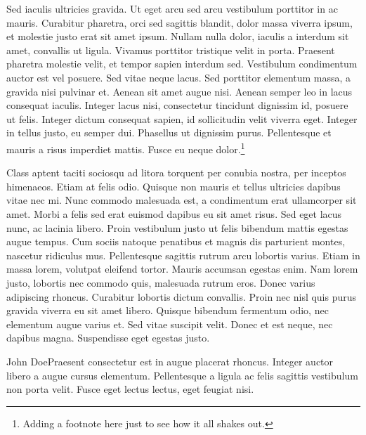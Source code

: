 Sed iaculis ultricies gravida. Ut eget arcu sed arcu vestibulum porttitor in ac mauris. Curabitur pharetra, orci sed sagittis blandit, dolor massa viverra ipsum, et molestie justo erat sit amet ipsum. Nullam nulla dolor, iaculis a interdum sit amet, convallis ut ligula. Vivamus porttitor tristique velit in porta. Praesent pharetra molestie velit, et tempor sapien interdum sed. Vestibulum condimentum auctor est vel posuere. Sed vitae neque lacus. Sed porttitor elementum massa, a gravida nisi pulvinar et. Aenean sit amet augue nisi. Aenean semper leo in lacus consequat iaculis. Integer lacus nisi, consectetur tincidunt dignissim id, posuere ut felis. Integer dictum consequat sapien, id sollicitudin velit viverra eget. Integer in tellus justo, eu semper dui. Phasellus ut dignissim purus. Pellentesque et mauris a risus imperdiet mattis. Fusce eu neque dolor.\footnote{Adding a footnote here just to see how it all shakes out. }

Class aptent taciti sociosqu ad litora torquent per conubia nostra, per inceptos himenaeos. Etiam at felis odio. Quisque non mauris et tellus ultricies dapibus vitae nec mi. Nunc commodo malesuada est, a condimentum erat ullamcorper sit amet. Morbi a felis sed erat euismod dapibus eu sit amet risus. Sed eget lacus nunc, ac lacinia libero. Proin vestibulum justo ut felis bibendum mattis egestas augue tempus. Cum sociis natoque penatibus et magnis dis parturient montes, nascetur ridiculus mus. Pellentesque sagittis rutrum arcu lobortis varius. Etiam in massa lorem, volutpat eleifend tortor. Mauris accumsan egestas enim. Nam lorem justo, lobortis nec commodo quis, malesuada rutrum eros. Donec varius adipiscing rhoncus. Curabitur lobortis dictum convallis. Proin nec nisl quis purus gravida viverra eu sit amet libero. Quisque bibendum fermentum odio, nec elementum augue varius et. Sed vitae suscipit velit. Donec et est neque, nec dapibus magna. Suspendisse eget egestas justo.

\begin{dialogue}{John Doe}{Praesent consectetur est in augue placerat rhoncus. Integer auctor libero a augue cursus elementum. Pellentesque a ligula ac felis sagittis vestibulum non porta velit. Fusce eget lectus lectus, eget feugiat nisi.}\end{dialogue}


